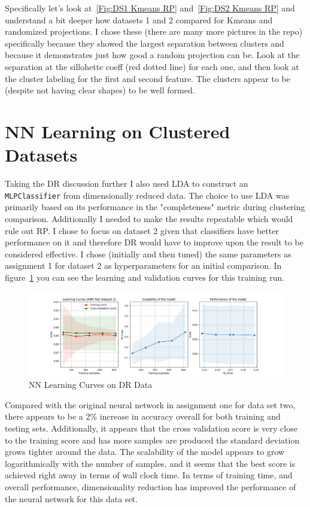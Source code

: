 \documentclass[11pt]{article}
\begin{document}
    Specifically let's look at~\ref{Fig:DS1 Kmeans RP} and~\ref{Fig:DS2 Kmeans RP} and understand a bit deeper how datasets 1 and 2 compared for Kmeans and randomized projections.
    I chose these (there are many more pictures in the repo) specifically because they showed the largest separation between
    clusters and because it demonstrates just how good a random projection can be.
    Look at the separation at the sillohette coeff (red dotted line) for each one, and then look at the cluster labeling
    for the first and second feature.
    The clusters appear to be (despite not having clear shapes) to be well formed.


    \section{NN Learning on Clustered Datasets}\label{sec:nn-learning-on-clustered-datasets}
    Taking the DR discussion further I also used LDA to construct an \texttt{MLPClassifier} from dimensionally reduced data.
    The choice to use LDA was primarily based on its performance in the "completeness" metric during clustering comparison.
    Additionally I needed to make the results repeatable which would rule out RP.
    I chose to focus on dataset 2 given that classifiers have better performance on it and therefore DR would have to improve
    upon the result to be considered effective.
    I chose (initially and then tuned) the same parameters as assignment 1 for dataset 2 as hyperparameters for an initial
    comparison.
    In figure~\ref{Fig:NN Learning Curves on DR Data} you can see the learning and validation curves for this training run.
    \begin{figure}
        \centering
        \includegraphics[width=.9\linewidth]{ann1.png}
        \caption{NN Learning Curves on DR Data}\label{Fig:NN Learning Curves on DR Data}
    \end{figure}
    Compared with the original neural network in assignment one for data set two, there appears to be a 2\% increase in accuracy overall for both training and testing sets.
    Additionally, it appears that the cross validation score is very close to the training score and has more samples are produced the standard deviation grows tighter around the data.
    The scalability of the model appears to grow logarithmically with the number of samples, and it seems that the best score is achieved right away in terms of wall clock time.
    In terms of training time, and overall performance, dimensionality reduction has improved the performance of the neural network for this data set.
\end{document}
